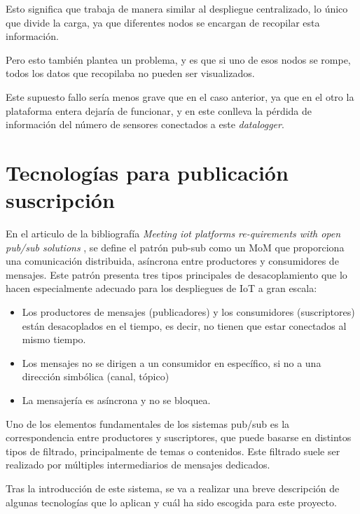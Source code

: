 
Esto significa que trabaja de manera similar al despliegue centralizado, lo único que divide la carga, ya que diferentes nodos se encargan de recopilar esta información.

Pero esto también plantea un problema, y es que si uno de esos nodos se rompe, todos los datos que recopilaba no pueden ser visualizados.

Este supuesto fallo sería menos grave que en el caso anterior, ya que en el otro la plataforma entera dejaría de funcionar, y en este conlleva la pérdida de información del número de sensores conectados a este \textit{datalogger}.

\section{Tecnologías para publicación suscripción} \label{tecnologias_a_usar}

En el articulo de la bibliografía \textit{Meeting iot platforms re-quirements with open pub/sub solutions} \cite{pub-sub-solutions}, se define el patrón pub-sub como un \ac{MoM} que proporciona una comunicación distribuida, asíncrona entre productores y consumidores de mensajes. Este patrón presenta tres tipos principales de desacoplamiento que lo hacen especialmente adecuado para los despliegues de \ac{IoT} a gran escala:

\begin{itemize}
    \item Los productores de mensajes (publicadores) y los consumidores (suscriptores) están desacoplados en el tiempo, es decir, no tienen que estar conectados al mismo tiempo.
    \item Los mensajes no se dirigen a un consumidor en específico, si no a una dirección simbólica (canal, tópico)
    \item La mensajería es asíncrona y no se bloquea.
\end{itemize}

Uno de los elementos fundamentales de los sistemas pub/sub es la correspondencia entre productores y suscriptores, que puede basarse en distintos tipos de filtrado, principalmente de temas o contenidos. Este filtrado suele ser realizado por múltiples intermediarios de mensajes dedicados.

Tras la introducción de este sistema, se va a realizar una breve descripción de algunas tecnologías que lo aplican y cuál ha sido escogida para este proyecto.

